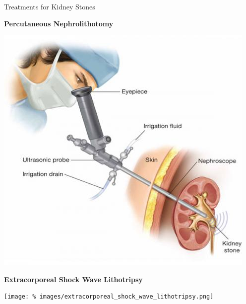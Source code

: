 \documentclass[8pt,aspectratio=169]{beamer}
\begin{document}
\begin{frame}{Treatments for Kidney Stones}
\begin{minipage}[t]{0.25\textwidth}
  \end{minipage}%
  \begin{minipage}[t]{0.35\textwidth}

    {\bfseries Percutaneous Nephrolithotomy}

    \includegraphics[width=\textwidth]{images/percutaneous-nephrolithotomy.jpg}

  \end{minipage}%
  \begin{minipage}[t]{0.4\textwidth}

    {\bfseries Extracorporeal Shock Wave Lithotripsy}

    \texttt{[image: \%
      images/extracorporeal\_shock\_wave\_lithotripsy.png]}

    \end{minipage}

\end{frame}

\end{document}
